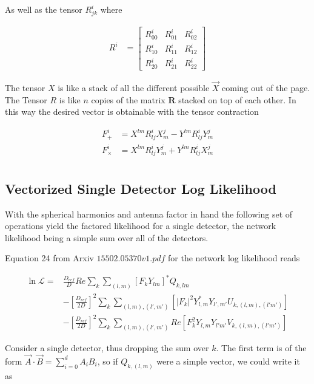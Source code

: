 \documentclass[paper=a4, fontsize=11pt]{scrartcl} %
\numberwithin{equation}{section} %
\numberwithin{figure}{section} %
\numberwithin{table}{section} %
\begin{document}
As well as the tensor $R^{i}_{jk}$ where

\begin{align}
R^{i} &= 
\begin{bmatrix}
R^{i}_{00} & R^{i}_{01} & R^{i}_{02} \\ 
R^{i}_{10} & R^{i}_{11} & R^{i}_{12} \\ 
R^{i}_{20} & R^{i}_{21} & R^{i}_{22}  
\end{bmatrix}
\end{align}

The tensor $X$ is like a stack of all the different possible $\vec{X}$ coming out of the page. The Tensor $R$ is like $n$ copies of the matrix $\mathbf{R}$ stacked on top of each other. In this way the desired vector is obtainable with the tensor contraction

\begin{align}
F^{i}_{+} &= X^{lm}R^{i}_{lj}X^{j}_{m} - Y^{lm}R^{i}_{lj}Y^{j}_{m} \\ 
F^{i}_{\times} &= X^{lm}R^{i}_{lj}Y^{j}_{m} + Y^{lm}R^{i}_{lj}X^{j}_{m} \\ 
\end{align}

\subsection{Vectorized Single Detector Log Likelihood}

With the spherical harmonics and antenna factor in hand the following set of operations yield the factored likelihood for a single detector, the network likelihood being a simple sum over all of the detectors.

Equation 24 from Arxiv $15502.05370v1.pdf$ for the network log likelihood reads 

\begin{align}
\ln{\mathcal{L}} = &\frac{D_{ref}}{D}Re \sum_{k}\sum_{(l,m)}\left[F_k Y_{lm}\right]^{*}Q_{k,lm} \\ 
& - \left[\frac{D_{ref}}{2D}\right]^{2}\sum_{k}\sum_{(l,m),(l',m')}\left[|F_k|^2 Y_{l,m}^{*}Y_{l',m'}U_{k,(l,m),(l'm')}\right] \\
 & - \left[\frac{D_{ref}}{2D}\right]^{2}\sum_{k}\sum_{(l,m),(l',m')}Re\left[  F_{k}^{2}Y_{l,m}Y_{l'm'}V_{k,(l,m),(l'm')}\right]
\end{align}

Consider a single detector, thus dropping the sum over $k$. The first term is of the form $\vec{A}\cdot\vec{B} = \sum_{i=0}^{d}A_iB_i$, so if $Q_{k,(l,m)}$ were a simple vector, we could write it as
\end{document}
